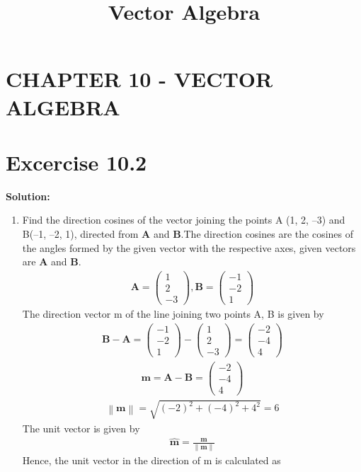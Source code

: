 \documentclass[12pt]{article}
\providecommand{\norm}[1]{\left\lVert#1\right\rVert}
\newcommand{\solution}{\noindent \textbf{Solution: }}
\newcommand{\myvec}[1]{\ensuremath{\begin{pmatrix}#1\end{pmatrix}}}
\let\vec\mathbf
\begin{document}
\begin{center}
\enlargethispage{-4cm}
\title{\textbf{Vector Algebra}}
\date{\vspace{-5ex}} %
\maketitle
\end{center}
\setcounter{page}{1}
\section*{CHAPTER 10 - VECTOR ALGEBRA}
\section*{Excercise 10.2}
\solution 
\begin{enumerate}
\item Find the direction cosines of the vector joining the points A (1, 2, –3) and B(–1, –2, 1), directed from $\vec{A}$ and $\vec{B}$.The direction cosines are the cosines of the angles formed by the given vector with the respective axes, given vectors are $\vec{A}$ and $\vec{B}$.
\begin{align}
	\vec{A} =\myvec{1\\2\\-3} , \vec{B}=\myvec{-1\\-2\\1}
\end{align}
The direction vector m of the line joining two points A, B is given by
\begin{align}
	\vec{B-A} = \myvec{-1\\-2\\1}-\myvec{1\\2\\-3}=\myvec{-2\\-4\\4}
\end{align}
\begin{align}
	\vec{m}=\vec{A-B}=\myvec{-2\\-4\\4}
\end{align}
\begin{align}
	\norm{\vec{m}}=\sqrt{(-2)^2+(-4)^2+4^2}=6
\end{align}
The unit vector is given by 
\begin{align}
\hat{\vec{m}}=\frac{\vec{m}}{\norm{\vec{m}}}
\end{align}
Hence, the unit vector in the direction of m is calculated as

\end{enumerate}
\end{document}
